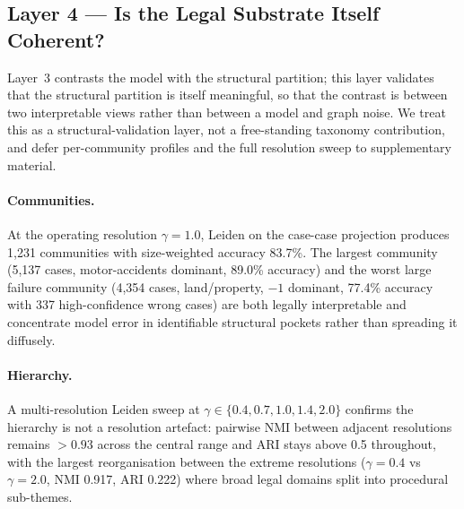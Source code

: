 \documentclass[runningheads]{llncs}
\begin{document}
\subsection{Layer 4 --- Is the Legal Substrate Itself Coherent?}
\label{subsec:exp-structure}

Layer~3 contrasts the model with the structural partition; this layer validates that the structural partition is itself meaningful, so that the contrast is between two interpretable views rather than between a model and graph noise. We treat this as a structural-validation layer, not a free-standing taxonomy contribution, and defer per-community profiles and the full resolution sweep to supplementary material.

\paragraph{Communities.} At the operating resolution $\gamma = 1.0$, Leiden on the case-case projection produces 1{,}231 communities with size-weighted accuracy 83.7\%. The largest community (5{,}137 cases, motor-accidents dominant, 89.0\% accuracy) and the worst large failure community (4{,}354 cases, land/property, $-1$ dominant, 77.4\% accuracy with 337 high-confidence wrong cases) are both legally interpretable and concentrate model error in identifiable structural pockets rather than spreading it diffusely.

\paragraph{Hierarchy.} A multi-resolution Leiden sweep at $\gamma \in \{0.4, 0.7, 1.0, 1.4, 2.0\}$ confirms the hierarchy is not a resolution artefact: pairwise NMI between adjacent resolutions remains $>0.93$ across the central range and ARI stays above 0.5 throughout, with the largest reorganisation between the extreme resolutions ($\gamma=0.4$ vs $\gamma=2.0$, NMI 0.917, ARI 0.222) where broad legal domains split into procedural sub-themes.
\end{document}
